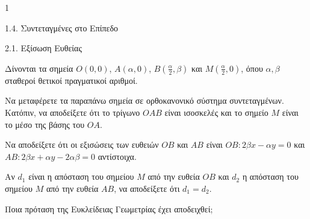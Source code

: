 \begin{ylh}{1}
    \item 1.4. Συντεταγμένες στο Επίπεδο
    \item 2.1. Εξίσωση Ευθείας
\end{ylh}
Δίνονται τα σημεία $O(0,0)$, $A(\alpha,0)$, $B\left(\frac{\alpha}{2},\beta\right)$ και $M\left(\frac{\alpha}{2},0\right)$, όπου $\alpha,\beta$ σταθεροί θετικοί πραγματικοί αριθμοί.
\begin{alist}
\item Να μεταφέρετε τα παραπάνω σημεία σε ορθοκανονικό σύστημα συντεταγμένων. Κατόπιν, να αποδείξετε ότι το τρίγωνο $OAB$ είναι ισοσκελές και το σημείο $M$ είναι το μέσο της βάσης του $OA$. 
\item Να αποδείξετε ότι οι εξισώσεις των ευθειών $OB$ και $AB$ είναι $OB: 2\beta x - \alpha y = 0$ και $AB : 2\beta x + \alpha y - 2\alpha\beta = 0$ αντίστοιχα. 
\item Αν $d_1$ είναι η απόσταση του σημείου $M$ από την ευθεία $OB$ και $d_2$ η απόσταση του σημείου $M$ από την ευθεία $AB$, να αποδείξετε ότι $d_1 = d_2$. 
\item Ποια πρόταση της Ευκλείδειας Γεωμετρίας έχει αποδειχθεί; 
\end{alist}